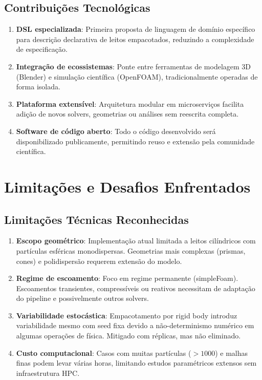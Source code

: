 \subsection{Contribuições Tecnológicas}

\begin{enumerate}
    \item \textbf{DSL especializada}: Primeira proposta de linguagem de domínio específico para descrição declarativa de leitos empacotados, reduzindo a complexidade de especificação.
    
    \item \textbf{Integração de ecossistemas}: Ponte entre ferramentas de modelagem 3D (Blender) e simulação científica (OpenFOAM), tradicionalmente operadas de forma isolada.
    
    \item \textbf{Plataforma extensível}: Arquitetura modular em microserviços facilita adição de novos solvers, geometrias ou análises sem reescrita completa.
    
    \item \textbf{Software de código aberto}: Todo o código desenvolvido será disponibilizado publicamente, permitindo reuso e extensão pela comunidade científica.
\end{enumerate}

\section{Limitações e Desafios Enfrentados}

\subsection{Limitações Técnicas Reconhecidas}

\begin{enumerate}
    \item \textbf{Escopo geométrico}: Implementação atual limitada a leitos cilíndricos com partículas esféricas monodispersas. Geometrias mais complexas (prismas, cones) e polidispersão requerem extensão do modelo.
    
    \item \textbf{Regime de escoamento}: Foco em regime permanente (simpleFoam). Escoamentos transientes, compressíveis ou reativos necessitam de adaptação do pipeline e possivelmente outros solvers.
    
    \item \textbf{Variabilidade estocástica}: Empacotamento por rigid body introduz variabilidade mesmo com seed fixa devido a não-determinismo numérico em algumas operações de física. Mitigado com réplicas, mas não eliminado.
    
    \item \textbf{Custo computacional}: Casos com muitas partículas ($> 1000$) e malhas finas podem levar várias horas, limitando estudos paramétricos extensos sem infraestrutura HPC.
\end{enumerate}

